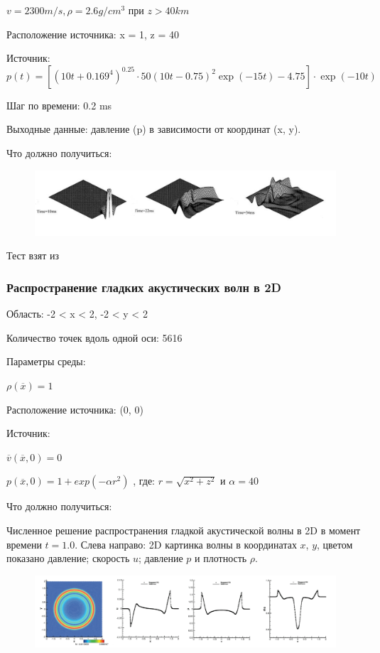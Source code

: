\documentclass{article}
\begin{document}
$v = 2300 m/s, \rho = 2.6 g/cm^3$ при $z > 40 km$

Расположение источника: x = 1, z = 40	

Источник:
$$p(t) =  \left[\left(10t  + 0.169^4\right)^{0.25} \cdot 50(10t-0.75)^2 \exp( -15 t) - 4.75\right] \cdot \exp( -10t ) $$

Шаг по времени: 0.2 ms

Выходные данные: давление (p) в зависимости от координат (x, y).

Что должно получиться:

\begin{figure}[h]
  \begin{center}
    \includegraphics[scale=0.7]{2D_acoustic_tests/second.PNG}
  \end{center}
\end{figure}

Тест взят из \cite{2.5D}

\subsubsection {Распространение гладких акустических волн в 2D} 


Область: -2 < x < 2, -2 < y < 2

Количество точек вдоль одной оси: 5616

Параметры среды:

$ \rho (\overline{x}) = 1$

Расположение источника: (0, 0)

Источник:

$ \overline{v} (\overline{x}, 0) = 0$

$ p(\overline{x}, 0) = 1 + exp(- \alpha r^2)$ , где: $r = \sqrt{x^2 + z^2}$ и $ \alpha = 40$

Что должно получиться:

Численное решение распространения гладкой акустической волны в 2D в момент времени $t = 1.0$. Слева направо: 2D картинка волны в координатах $x$, $y$, цветом показано давление; скорость $u$; давление $p$ и плотность $\rho$.

\begin{figure}[h]
  \begin{center}
    \includegraphics[scale=0.63]{2D_acoustic_tests/third.PNG}
  \end{center}
\end{figure}
\end{document}
